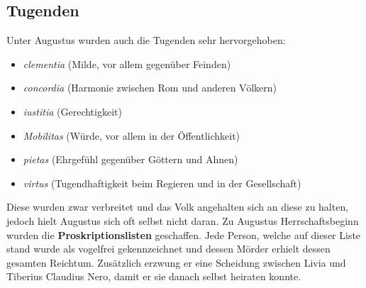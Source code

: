 \documentclass{article}
\begin{document}
	\subsection{Tugenden}
	Unter Augustus wurden auch die Tugenden sehr hervorgehoben:
	\begin{itemize}
		\item{\textit{clementia} (Milde, vor allem gegenüber Feinden)}
		\item{\textit{concordia} (Harmonie zwischen Rom und anderen Völkern)}
		\item{\textit{iustitia} (Gerechtigkeit)}
		\item{\textit{Mobilitas} (Würde, vor allem in der Öffentlichkeit)}
		\item{\textit{pietas} (Ehrgefühl gegenüber Göttern und Ahnen)}
		\item{\textit{virtus} (Tugendhaftigkeit beim Regieren und in der Gesellschaft)}
	\end{itemize}
	Diese wurden zwar verbreitet und das Volk angehalten sich an diese zu halten, jedoch hielt Augustus sich oft selbst nicht daran. Zu Augustus Herrschaftsbeginn wurden die \textbf{Proskriptionslisten} geschaffen. Jede Person, welche auf dieser Liste stand wurde als vogelfrei gekennzeichnet und dessen Mörder erhielt dessen gesamten Reichtum. Zusätzlich erzwung er eine Scheidung zwischen Livia und Tiberius Claudius Nero, damit er sie danach selbst heiraten konnte. \\
\end{document}
